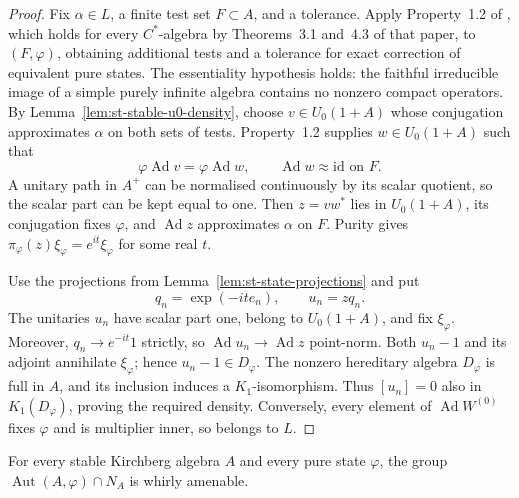 \begin{proof}
Fix $\alpha\in L$, a finite test set $F\subset A$, and a tolerance. Apply
Property~1.2 of \cite{KishimotoOzawaSakai2003}, which holds for every $C^*$-algebra by
Theorems~3.1 and~4.3 of that paper, to $(F,\varphi)$, obtaining additional tests and a
tolerance for exact correction of equivalent pure states. The essentiality
hypothesis holds: the faithful irreducible image of a simple purely infinite
algebra contains no nonzero compact operators. By Lemma~\ref{lem:st-stable-u0-density}, choose $v\in U_0(1+A)$ whose conjugation
approximates $\alpha$ on both sets of tests. Property~1.2 supplies $w\in
U_0(1+A)$ such that 
\begin{equation*}
\varphi\operatorname{Ad} v=\varphi\operatorname{Ad} w,\qquad  \operatorname{Ad} w\approx\mathrm{id}\text{ on }F. 
\end{equation*}
A unitary path in $A^+$ can be normalised continuously by its scalar
quotient, so the scalar part can be kept equal to one. Then $z=vw^*$ lies in 
$U_0(1+A)$, its conjugation fixes $\varphi$, and $\operatorname{Ad} z$ approximates $\alpha
$ on $F$. Purity gives $\pi_\varphi(z)\xi_\varphi=e^{it}\xi_\varphi$ for
some real $t$.

Use the projections from Lemma~\ref{lem:st-state-projections} and put 
\begin{equation*}
q_n=\exp(-it e_n),\qquad u_n=zq_n. 
\end{equation*}
The unitaries $u_n$ have scalar part one, belong to $U_0(1+A)$, and fix $\xi_\varphi$. Moreover, $q_n\to e^{-it}1$ strictly, so $\operatorname{Ad} u_n\to\operatorname{Ad} z$
point-norm. Both $u_n-1$ and its adjoint annihilate $\xi_\varphi$; hence $u_n-1\in D_\varphi$. The nonzero hereditary algebra $D_\varphi$ is full in $A
$, and its inclusion induces a $K_1$-isomorphism. Thus $[u_n]=0$ also in $K_1(D_\varphi)$, proving the required density. Conversely, every element of $\operatorname{Ad} W^{(0)}$ fixes $\varphi$ and is multiplier inner, so belongs to $L$.
\end{proof}

\begin{theorem}\label{thm:st-stable-marked-kernel}
 For every stable Kirchberg algebra $A$ and
every pure state $\varphi$, the group $\operatorname{Aut}(A,\varphi)\cap N_A$ is whirly
amenable.
\end{theorem}

